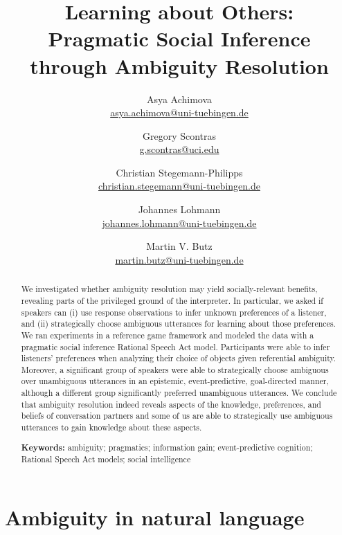 \documentclass[11pt,a4paper]{article}
\title{Learning about Others:\\
	Pragmatic Social Inference \\ through Ambiguity Resolution
}
\author{
		Asya Achimova\\
		\href{mailto:asya.achimova@uni-tuebingen.de}{asya.achimova@uni-tuebingen.de}
	\and
		Gregory Scontras\\
		\href{mailto:g.scontras@uci.edu}{g.scontras@uci.edu}
	\and 
		Christian Stegemann-Philipps\\
		\href{mailto:christian.stegemann@uni-tuebingen.de}{christian.stegemann@uni-tuebingen.de}
	\and
		Johannes Lohmann\\
		\href{mailto:johannes.lohmann@uni-tuebingen.de}{johannes.lohmann@uni-tuebingen.de}
	\and
		Martin V. Butz \\
		\href{mailto:martin.butz@uni-tuebingen.de}{martin.butz@uni-tuebingen.de}
}
\begin{document}
\maketitle

\begin{abstract}

We investigated whether ambiguity resolution may yield socially-relevant benefits,
revealing parts of the privileged ground of the interpreter. 
In particular, we asked if speakers can (i) use response observations to infer unknown preferences of a listener, and (ii) strategically choose ambiguous utterances for learning about those preferences. 
We ran experiments in a reference game framework and modeled the data with a pragmatic social inference Rational Speech Act model.
Participants were able to infer listeners' preferences when analyzing their choice of objects given referential ambiguity.
Moreover, a significant group of speakers were able to strategically choose ambiguous over unambiguous utterances in an epistemic, event-predictive, goal-directed manner, although a different group significantly preferred unambiguous utterances. 
We conclude that ambiguity resolution indeed reveals aspects of the knowledge, preferences, and beliefs of conversation partners and some of us are able to strategically use ambiguous utterances to gain knowledge about these aspects.
                                                                 

\textbf{Keywords:} 
ambiguity; pragmatics; information gain; event-predictive cognition; Rational Speech Act models; social intelligence
\end{abstract}

\section{Ambiguity in natural language}

\noindent 
\end{document}

